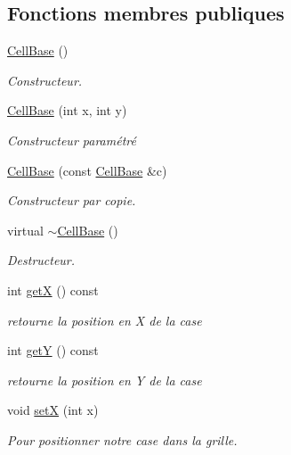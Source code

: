 \subsection*{Fonctions membres publiques}
\begin{DoxyCompactItemize}
\item 
\hyperlink{class_cell_base_ac5cbc18d3f767bb91d9e052a3eb778b5}{Cell\-Base} ()
\begin{DoxyCompactList}\small\item\em Constructeur. \end{DoxyCompactList}\item 
\hyperlink{class_cell_base_a12169f30ca7038d58bdf810cb6314df0}{Cell\-Base} (int x, int y)
\begin{DoxyCompactList}\small\item\em Constructeur paramétré \end{DoxyCompactList}\item 
\hyperlink{class_cell_base_ae2b545b0d403816ba1d572cee7f97ec9}{Cell\-Base} (const \hyperlink{class_cell_base}{Cell\-Base} \&c)
\begin{DoxyCompactList}\small\item\em Constructeur par copie. \end{DoxyCompactList}\item 
virtual \hyperlink{class_cell_base_a91df7ce6090723939914fc08ae5dd25e}{$\sim$\-Cell\-Base} ()
\begin{DoxyCompactList}\small\item\em Destructeur. \end{DoxyCompactList}\item 
int \hyperlink{class_cell_base_a0df4af1a9faa0e1bc1d2ac22947b3281}{get\-X} () const 
\begin{DoxyCompactList}\small\item\em retourne la position en X de la case \end{DoxyCompactList}\item 
int \hyperlink{class_cell_base_a51f37b58bdf1ef4d51d956d02f35b411}{get\-Y} () const 
\begin{DoxyCompactList}\small\item\em retourne la position en Y de la case \end{DoxyCompactList}\item 
void \hyperlink{class_cell_base_a3280e04207e4419d425913d519fb867d}{set\-X} (int x)
\begin{DoxyCompactList}\small\item\em Pour positionner notre case dans la grille. \end{DoxyCompactList}\item 

\end{DoxyCompactItemize}
